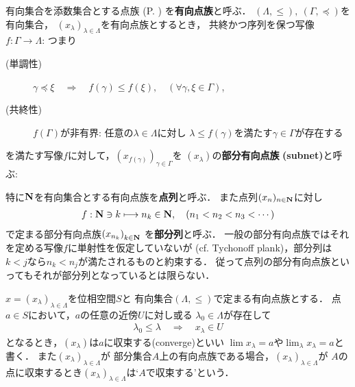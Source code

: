 	\begin{screen}
		\begin{dfn}[有向点族]
			有向集合を添数集合とする点族
			(P. \pageref{dfn:family_collection})
			を{\bf 有向点族}と呼ぶ．
			$(\Lambda,\leq),\ (\Gamma,\preceq)$を有向集合，
			$(x_\lambda)_{\lambda \in \Lambda}$を有向点族とするとき，
			共終かつ序列を保つ写像$f:\Gamma \longrightarrow \Lambda$:
			つまり
			\begin{description}
				\item[(単調性)] $\gamma \preceq \xi \quad \Longrightarrow \quad
					f(\gamma) \leq f(\xi),\quad (\forall \gamma,\xi \in \Gamma)$,
				\item[(共終性)] $f(\Gamma)$が非有界:
					任意の$\lambda \in \Lambda$に対し
					$\lambda \leq f(\gamma)$を満たす$\gamma \in \Gamma$が存在する
			\end{description}
			を満たす写像$f$に対して，$\left(x_{f(\gamma)}\right)_{\gamma \in \Gamma}$を
			$(x_\lambda)$の{\bf 部分有向点族}
			{\bf (subnet)}と呼ぶ:
		\end{dfn}
	\end{screen}
	特に$\mathbf{N}$を有向集合とする有向点族を{\bf 点列}と呼ぶ．
	また点列$(x_n)_{n \in \mathbf{N}}$に対し
	\begin{align}
		f:\mathbf{N} \ni k \longmapsto n_k \in \mathbf{N},
		\quad (n_1 < n_2 < n_3 < \cdots)
	\end{align}
	で定まる部分有向点族$\left(x_{n_k}\right)_{k \in \mathbf{N}}$
	を{\bf 部分列}と呼ぶ．
	一般の部分有向点族ではそれを定める写像$f$に単射性を仮定していないが
	(cf. Tychonoff plank)，部分列は$k < j$なら$n_k < n_j$が満たされるものと約束する．
	従って点列の部分有向点族といってもそれが部分列となっているとは限らない．
	
	\begin{screen}
		\begin{dfn}
			$x = (x_\lambda)_{\lambda \in \Lambda}$を位相空間$S$と
			有向集合$(\Lambda,\leq)$で定まる有向点族とする．
			点$a \in S$において，$a$の任意の近傍$U$に対し或る
			$\lambda_0 \in \Lambda$が存在して
			\begin{align}
				\lambda_0 \leq \lambda \quad \Longrightarrow \quad
				x_\lambda \in U
			\end{align}
			となるとき，$(x_\lambda)$は$a$に収束する(converge)といい
			$\lim x_\lambda = a$や$\lim_{\lambda} x_\lambda = a$と書く．
			また$(x_\lambda)_{\lambda \in \Lambda}$が
			部分集合$A$上の有向点族である場合，$(x_\lambda)_{\lambda \in \Lambda}$が
			$A$の点に収束するとき$(x_\lambda)_{\lambda \in \Lambda}$は`$A$で収束する'という．
		\end{dfn}
	\end{screen}
	
